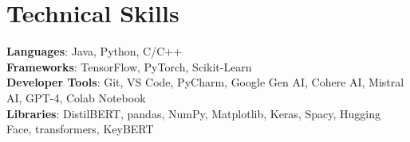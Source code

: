 \documentclass[letterpaper,11pt]{article}
\begin{document}
\section{Technical Skills}
 \begin{itemize}[leftmargin=0.15in, label={}]
    \small{\item{
     \textbf{Languages}{: Java, Python, C/C++} \\
     \textbf{Frameworks}{: TensorFlow, PyTorch, Scikit-Learn} \\
     \textbf{Developer Tools}{: Git, VS Code, PyCharm, Google Gen AI, Cohere AI, Mistral AI, GPT-4, Colab Notebook} \\
     \textbf{Libraries}{: DistilBERT, pandas, NumPy, Matplotlib, Keras, Spacy, Hugging Face, transformers, KeyBERT}
    }}
 \end{itemize}


\end{document}
